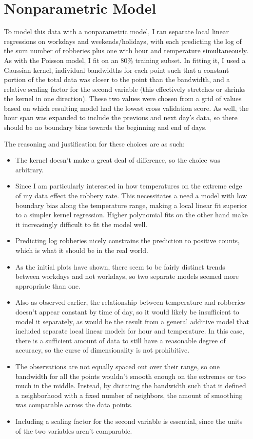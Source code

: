 \documentclass[11pt]{article}
\theoremstyle{definition}
\begin{document}
\section{Nonparametric Model} 
To model this data with a nonparametric model, I ran separate local linear regressions on workdays and weekends/holidays, with each predicting the log of the sum number of robberies plus one with hour and temperature simultaneously. As with the Poisson model, I fit on an $80\%$ training subset. In fitting it, I used a Gaussian kernel, individual bandwidths for each point such that a constant portion of the total data was closer to the point than the bandwidth, and a relative scaling factor for the second variable (this effectively stretches or shrinks the kernel in one direction). These two values were chosen from a grid of values based on which resulting model had the lowest cross validation score. As well, the hour span was expanded to include the previous and next day's data, so there should be no boundary bias towards the beginning and end of days.\par
The reasoning and justification for these choices are as such:
\begin{itemize}
    \item The kernel doesn't make a great deal of difference, so the choice was arbitrary. 
    \item Since I am particularly interested in how temperatures on the extreme edge of my data effect the robbery rate. This necessitates a need a model with low boundary bias along the temperature range, making a local linear fit superior to a simpler kernel regression. Higher polynomial fits on the other hand make it increasingly difficult to fit the model well.
    \item Predicting log robberies nicely constrains the prediction to positive counts, which is what it should be in the real world.
    \item As the initial plots have shown, there seem to be fairly distinct trends between workdays and not workdays, so two separate models seemed more appropriate than one. 
    \item Also as observed earlier, the relationship between temperature and robberies doesn't appear constant by time of day, so it would likely be insufficient to model it separately, as would be the result from a general additive model that included separate local linear models for hour and temperature. In this case, there is a sufficient amount of data to still have a reasonable degree of accuracy, so the curse of dimensionality is not prohibitive.  
    \item The observations are not equally spaced out over their range, so one bandwidth for all the points wouldn't smooth enough on the extremes or too much in the middle. Instead, by dictating the bandwidth such that it defined a neighborhood with a fixed number of neighbors, the amount of smoothing was comparable across the data points.
    \item Including a scaling factor for the second variable is essential, since the units of the two variables aren't comparable.
\end{itemize} \par
\end{document}
